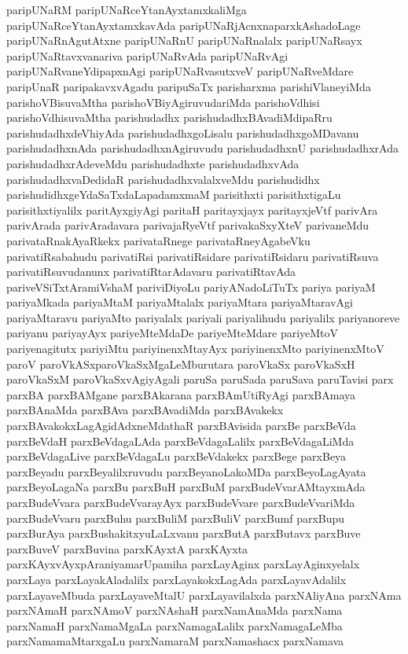 {paripUNaRM
paripUNaRceYtanAyxtamxkaliMga
paripUNaRceYtanAyxtamxkavAda
paripUNaRjAcnxnaparxkAshadoLage
paripUNaRnAgutAtxne
paripUNaRnU
paripUNaRnalalx
paripUNaRsayx
paripUNaRtavxvanariva
paripUNaRvAda
paripUNaRvAgi
paripUNaRvaneYdipapxnAgi
paripUNaRvasutxveV
paripUNaRveMdare
paripUnaR
paripakavxvAgadu
paripuSaTx
parisharxma
parishiVlaneyiMda
parishoVBisuvaMtha
parishoVBiyAgiruvudariMda
parishoVdhisi
parishoVdhisuvaMtha
parishudadhx
parishudadhxBAvadiMdipaRru
parishudadhxdeVhiyAda
parishudadhxgoLisalu
parishudadhxgoMDavanu
parishudadhxnAda
parishudadhxnAgiruvudu
parishudadhxnU
parishudadhxrAda
parishudadhxrAdeveMdu
parishudadhxte
parishudadhxvAda
parishudadhxvaDedidaR
parishudadhxvalalxveMdu
parishudidhx
parishudidhxgeYdaSaTxdaLapadamxmaM
parisithxti
parisithxtigaLu
parisithxtiyalilx
paritAyxgiyAgi
paritaH
paritayxjayx
paritayxjeVtf
parivAra
parivArada
parivAradavara
parivajaRyeVtf
parivakaSxyXteV
parivaneMdu
parivataRnakAyaRkekx
parivataRnege
parivataRneyAgabeVku
parivatiRsabahudu
parivatiRsi
parivatiRsidare
parivatiRsidaru
parivatiRsuva
parivatiRsuvudanunx
parivatiRtarAdavaru
parivatiRtavAda
pariveVSiTxtAramiVshaM
pariviDiyoLu
pariyANadoLiTuTx
pariya
pariyaM
pariyaMkada
pariyaMtaM
pariyaMtalalx
pariyaMtara
pariyaMtaravAgi
pariyaMtaravu
pariyaMto
pariyalalx
pariyali
pariyalihudu
pariyalilx
pariyanoreve
pariyanu
pariyayAyx
pariyeMteMdaDe
pariyeMteMdare
pariyeMtoV
pariyenagitutx
pariyiMtu
pariyinenxMtayAyx
pariyinenxMto
pariyinenxMtoV
paroV
paroVkASxparoVkaSxMgaLeMburutara
paroVkaSx
paroVkaSxH
paroVkaSxM
paroVkaSxvAgiyAgali
paruSa
paruSada
paruSava
paruTavisi
parx
parxBA
parxBAMgane
parxBAkarana
parxBAmUtiRyAgi
parxBAmaya
parxBAnaMda
parxBAva
parxBAvadiMda
parxBAvakekx
parxBAvakokxLagAgidAdxneMdathaR
parxBAvisida
parxBe
parxBeVda
parxBeVdaH
parxBeVdagaLAda
parxBeVdagaLalilx
parxBeVdagaLiMda
parxBeVdagaLive
parxBeVdagaLu
parxBeVdakekx
parxBege
parxBeya
parxBeyadu
parxBeyalilxruvudu
parxBeyanoLakoMDa
parxBeyoLagAyata
parxBeyoLagaNa
parxBu
parxBuH
parxBuM
parxBudeVvarAMtayxmAda
parxBudeVvara
parxBudeVvarayAyx
parxBudeVvare
parxBudeVvariMda
parxBudeVvaru
parxBuhu
parxBuliM
parxBuliV
parxBumf
parxBupu
parxBurAya
parxBushakitxyuLaLxvanu
parxButA
parxButavx
parxBuve
parxBuveV
parxBuvina
parxKAyxtA
parxKAyxta
parxKAyxvAyxpAraniyamarUpamiha
parxLayAginx
parxLayAginxyelalx
parxLaya
parxLayakAladalilx
parxLayakokxLagAda
parxLayavAdalilx
parxLayaveMbuda
parxLayaveMtalU
parxLayavilalxda
parxNAliyAna
parxNAma
parxNAmaH
parxNAmoV
parxNAshaH
parxNamAnaMda
parxNama
parxNamaH
parxNamaMgaLa
parxNamagaLalilx
parxNamagaLeMba
parxNamamaMtarxgaLu
parxNamaraM
parxNamashacx
parxNamava
}
